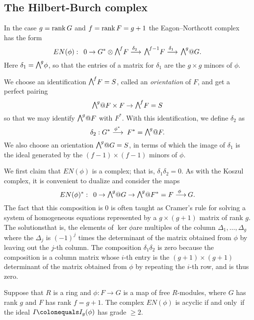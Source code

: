 
\subsection*{The Hilbert-Burch complex}

In the case $g=\operatorname{rank} G$ and $f = \operatorname{rank} F = g+1$ the
Eagon--Northcott complex has the form
$$
EN(\phi):\quad 0\to G^{*}\otimes \mwedge^{f}F \ruto {\delta_{2}}
\mwedge^{f-1}F \ruto {\delta_{1}} \mwedge^g@G.
$$
Here $\delta_{1} = \mwedge^{g}\phi$, so that the entries of a matrix for
$\delta_{1}$ are the $g\times g$ minors of
$\phi$.

We choose an identification $\mwedge^{f}F = S$, called an
%
\emph{orientation}
of $F$, and get a perfect pairing
$$
\mwedge^{g}@F \times F \to \mwedge^{f}F = S
$$
so that we may identify
$\mwedge^{g}@F$ with $F^{*}$. With this identification, we define
$\delta_{2}$ as
$$
\delta_{2}:  G^{*}\ruto {\phi^{*}}  F^{*} = \mwedge^{g}@F.
$$
We also choose an orientation $\mwedge^{g}@G = S$, in terms of which the
image of $\delta_{1}$ is
the ideal generated by the $(f{-}1)\times (f{-}1)$  minors of $\phi$.

We first claim that $EN(\phi)$ is a complex; that is,
$\delta_{1}\delta_{2} = 0$.  As with the Koszul complex,
%
it is convenient to dualize and consider the maps
$$
EN(\phi)^{*}:\quad 0\to \mwedge^{g} @
G \to \mwedge^{g}@F^{*} = F\ruto{\,\phi} G
.
$$
The fact that this composition is 0 is often taught as 
Cramer's rule
%
for solving a system of
homogeneous equations represented by a $g\times (g+1)$ matrix of rank $g$.
The solutions\emdash that is, the elements of $\ker \phi$\emdash are
multiples of the column
$\Delta_{1}, \dots, \Delta_{g}$ where the $\Delta_{j}$ is 
$(-1)^{j}$
times the determinant
of the matrix obtained from $\phi$ by leaving out the $j$-th column. 
The composition $\delta_{1}\delta_{2}$ is zero
because the composition  is a column matrix whose $i$-th
entry is the
$(g+1)\times (g+1)$ determinant of the matrix obtained
from $\phi$ by
repeating the $i$-th row, and is thus zero.

\begin{theorem}\label{EN grade 2}
Suppose that $R$ is a ring and $\phi: F\to G$ is a map of  free
$R$-modules,
where $G$ has rank $g$ and $F$ has rank $f = g+1$.
The complex $EN(\phi)$ is acyclic if and only~if the ideal $I
\colonequals  I_{g}(\phi)$ has grade $\geq 2$.
\end{theorem}

